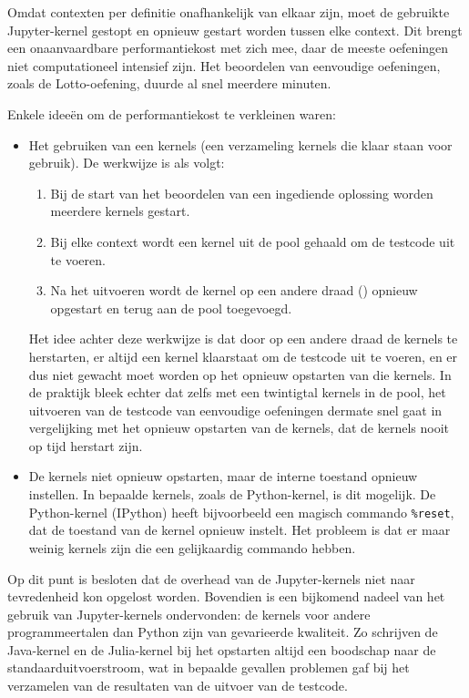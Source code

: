 Omdat contexten per definitie onafhankelijk van elkaar zijn, moet de gebruikte Jupyter-kernel gestopt en opnieuw gestart worden tussen elke context.
Dit brengt een onaanvaardbare performantiekost met zich mee, daar de meeste oefeningen niet computationeel intensief zijn.
Het beoordelen van eenvoudige oefeningen, zoals de Lotto-oefening, duurde al snel meerdere minuten.

Enkele ideeën om de performantiekost te verkleinen waren:

\begin{itemize}
    \item Het gebruiken van een  kernels (een verzameling kernels die klaar staan voor gebruik).
    De werkwijze is als volgt:
    \begin{enumerate}
        \item Bij de start van het beoordelen van een ingediende oplossing worden meerdere kernels gestart.
        \item Bij elke context wordt een kernel uit de pool gehaald om de testcode uit te voeren.
        \item Na het uitvoeren wordt de kernel op een andere draad () opnieuw opgestart en terug aan de pool toegevoegd.
    \end{enumerate}
    Het idee achter deze werkwijze is dat door op een andere draad de kernels te herstarten, er altijd een kernel klaarstaat om de testcode uit te voeren, en er dus niet gewacht moet worden op het opnieuw opstarten van die kernels.
    In de praktijk bleek echter dat zelfs met een twintigtal kernels in de pool, het uitvoeren van de testcode van eenvoudige oefeningen dermate snel gaat in vergelijking met het opnieuw opstarten van de kernels, dat de kernels nooit op tijd herstart zijn.
    \item De kernels niet opnieuw opstarten, maar de interne toestand opnieuw instellen.
    In bepaalde kernels, zoals de Python-kernel, is dit mogelijk.
    De Python-kernel (IPython) heeft bijvoorbeeld een magisch commando \texttt{\%reset}, dat de toestand van de kernel opnieuw instelt.
    Het probleem is dat er maar weinig kernels zijn die een gelijkaardig commando hebben.
\end{itemize}

Op dit punt is besloten dat de overhead van de Jupyter-kernels niet naar tevredenheid kon opgelost worden.
Bovendien is een bijkomend nadeel van het gebruik van Jupyter-kernels ondervonden: de kernels voor andere programmeertalen dan Python zijn van gevarieerde kwaliteit.
Zo schrijven de Java-kernel en de Julia-kernel bij het opstarten altijd een boodschap naar de standaarduitvoerstroom, wat in bepaalde gevallen problemen gaf bij het verzamelen van de resultaten van de uitvoer van de testcode.

